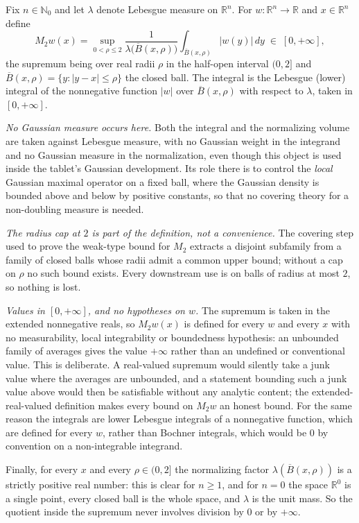\begin{definition}
Fix $n \in \mathbb{N}_0$ and let $\lambda$ denote Lebesgue measure on
$\mathbb{R}^n$.  For $w : \mathbb{R}^n \to \mathbb{R}$ and $x \in \mathbb{R}^n$
define
\[
  M_2 w(x)
    = \sup_{0 < \rho \leq 2}
        \frac{1}{\lambda\bigl(\overline B(x,\rho)\bigr)}
        \int_{\overline B(x,\rho)} |w(y)| \, dy
  \;\in\; [0,+\infty] ,
\]
the supremum being over real radii $\rho$ in the half-open interval $(0,2]$ and
$\overline B(x,\rho) = \{y : |y-x| \leq \rho\}$ the closed ball.  The integral
is the Lebesgue (lower) integral of the nonnegative function $|w|$ over
$\overline B(x,\rho)$ with respect to $\lambda$, taken in $[0,+\infty]$.

\emph{No Gaussian measure occurs here.}  Both the integral and the normalizing
volume are taken against Lebesgue measure, with no Gaussian weight in the
integrand and no Gaussian measure in the normalization, even though this object
is used inside the tablet's Gaussian development.  Its role there is to control
the \emph{local} Gaussian maximal operator on a fixed ball, where the Gaussian
density is bounded above and below by positive constants, so that no covering
theory for a non-doubling measure is needed.

\emph{The radius cap at $2$ is part of the definition, not a convenience.}  The
covering step used to prove the weak-type bound for $M_2$ extracts a disjoint
subfamily from a family of closed balls whose radii admit a common upper bound;
without a cap on $\rho$ no such bound exists.  Every downstream use is on balls
of radius at most $2$, so nothing is lost.

\emph{Values in $[0,+\infty]$, and no hypotheses on $w$.}  The supremum is taken
in the extended nonnegative reals, so $M_2w(x)$ is defined for every
$w$ and every $x$ with no measurability, local integrability or boundedness
hypothesis: an unbounded family of averages gives the value $+\infty$ rather
than an undefined or conventional value.  This is deliberate.  A real-valued
supremum would silently take a junk value where the averages are unbounded, and
a statement bounding such a junk value above would then be satisfiable without
any analytic content; the extended-real-valued definition makes every bound on
$M_2w$ an honest bound.  For the same reason the integrals are lower Lebesgue
integrals of a nonnegative function, which are defined for every $w$, rather
than Bochner integrals, which would be $0$ by convention on a non-integrable
integrand.

Finally, for every $x$ and every $\rho \in (0,2]$ the normalizing factor
$\lambda(\overline B(x,\rho))$ is a strictly positive real number: this is clear
for $n \geq 1$, and for $n = 0$ the space $\mathbb{R}^0$ is a single point,
every closed ball is the whole space, and $\lambda$ is the unit mass.  So the
quotient inside the supremum never involves division by $0$ or by $+\infty$.
\end{definition}
